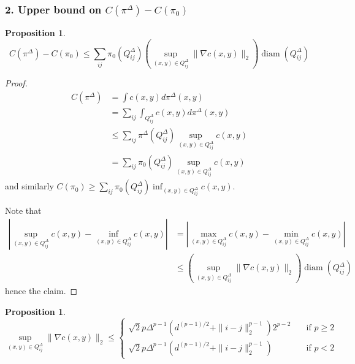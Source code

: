 \documentclass[12pt]{report}
\theoremstyle{definition}
\newtheorem{prop}[defi]{Proposition}
\theoremstyle{remark}
\DeclareMathOperator*{\diam}{diam}
\begin{document}
\subsubsection*{2. Upper bound on $C(\pi^{\Delta})-C(\pi_{0})$}

\begin{prop}\label{prop1}
	$$C(\pi^{\Delta})-C(\pi_{0})\leq \sum_{ij} \pi_0(Q_{ij}^{\Delta}) \left(\sup_{(x,y)\in Q_{ij}^\Delta} \|\nabla c(x,y)\|_2\right)\diam(Q_{ij}^{\Delta})$$
\end{prop}

\begin{proof}
	$$\begin{aligned}C(\pi^{\Delta}) 
&= \int c(x,y) d\pi^\Delta(x,y)\\
&= \sum_{ij} \int_{Q_{ij}^{\Delta}} c(x,y) d\pi^\Delta(x,y)\\
&\leq \sum_{ij} \pi^\Delta(Q_{ij}^{\Delta}) \sup_{(x,y)\in Q_{ij}^{\Delta}} c(x,y)\\
&= \sum_{ij} \pi_0(Q_{ij}^{\Delta}) \sup_{(x,y)\in Q_{ij}^{\Delta}} c(x,y) \end{aligned}$$
and similarly $C(\pi_{0}) \geq \sum_{ij} \pi_0(Q_{ij}^{\Delta}) \inf_{(x,y)\in Q_{ij}^{\Delta}} c(x,y)$.

\noindent Note that 
$$\begin{aligned}\left|\sup_{(x,y)\in Q_{ij}^{\Delta}} c(x,y) - \inf_{(x,y)\in Q_{ij}^{\Delta}} c(x,y)\right| 
&= \left|\max_{(x,y)\in Q_{ij}^{\Delta}} c(x,y) - \min_{(x,y)\in Q_{ij}^{\Delta}} c(x,y)\right|\\
&\leq \left(\sup_{(x,y)\in Q_{ij}^\Delta} \|\nabla c(x,y)\|_2\right)\diam(Q_{ij}^{\Delta})
\end{aligned}$$
hence the claim.
\end{proof}

\begin{prop}\label{prop2}
	$$\sup_{(x,y)\in Q_{ij}^\Delta} \|\nabla c(x,y)\|_2\leq \begin{cases}
\sqrt 2 p \Delta^{p-1}(d^{(p-1)/2}  + \|i-j\|_2^{p-1})2^{p-2} \quad &\text{if } p\geq 2 \\
\sqrt 2 p \Delta^{p-1}(d^{(p-1)/2}  + \|i-j\|_2^{p-1}) \quad &\text{if } p<2
\end{cases} $$
\end{prop}
 
\end{document}
